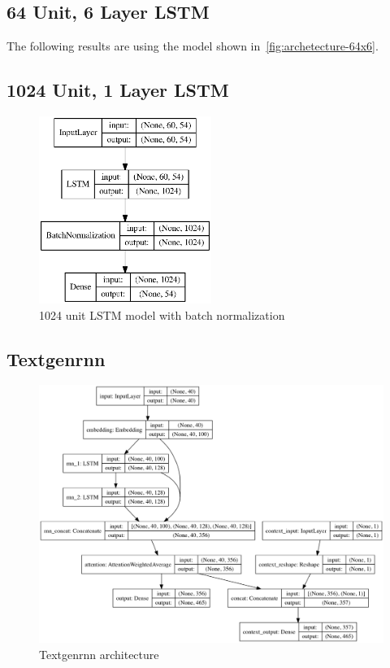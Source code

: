 \documentclass[letterpaper]{article}
\begin{document}
    \subsection{64 Unit, 6 Layer LSTM}
        The following results are using the model shown in~\autoref{fig:archetecture-64x6}.

    \subsection{1024 Unit, 1 Layer LSTM}
    \begin{figure}[h]
        \centering
        \includegraphics[width=0.5\textwidth]{figures/1024batchnorm.eps}
        \caption{1024 unit LSTM model with batch normalization}\label{fig:archetecture-256}
    \end{figure}

    \subsection{Textgenrnn}
    \begin{figure}[h]
        \centering
        \includegraphics[width=\textwidth]{figures/context_model.png}
        \caption{Textgenrnn architecture}\label{fig:archetecture-256}
    \end{figure}
\end{document}
